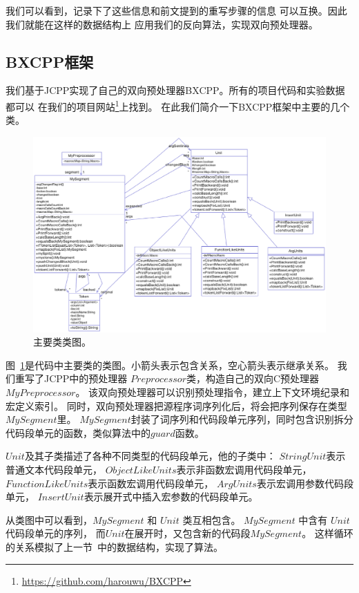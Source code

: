 我们可以看到，记录下了这些信息和前文提到的重写步骤的信息
可以互换。因此我们就能在这样的数据结构上
应用我们的反向算法，实现双向预处理器。


\subsection{BXCPP框架}
我们基于JCPP实现了自己的双向预处理器BXCPP。所有的项目代码和实验数据都可以
在我们的项目网站\footnote{\url{https://github.com/harouwu/BXCPP}}上找到。
在此我们简介一下BXCPP框架中主要的几个类。
\begin{figure}
\centering
\includegraphics[width=14cm]{pics/class.eps}
\caption{主要类类图。\label{pic:classd}}
\end{figure}


图~\ref{pic:classd}是代码中主要类的类图。小箭头表示包含关系，空心箭头表示继承关系。
我们重写了JCPP中的预处理器 $Preprocessor$类，构造自己的双向C预处理器 $MyPreprocessor$。
该双向预处理器可以识别预处理指令，建立上下文环境纪录和宏定义索引。
同时，双向预处理器把源程序词序列化后，将会把序列保存在类型 $MySegment$里。
$MySegment$封装了词序列和代码段单元序列，同时包含识别拆分代码段单元的函数，类似算法中的$guard$函数。


$Unit$及其子类描述了各种不同类型的代码段单元，他的子类中：
$StringUnit$表示普通文本代码段单元，
$ObjectLikeUnits$表示非函数宏调用代码段单元，
$FunctionLikeUnits$表示函数宏调用代码段单元，
$ArgUnits$表示宏调用参数代码段单元，
$InsertUnit$表示展开式中插入宏参数的代码段单元。

从类图中可以看到，$MySegment$ 和 $Unit$ 类互相包含。
$MySegment$ 中含有 $Unit$ 代码段单元的序列，
而$Unit$在展开时，又包含新的代码段$MySegment$。
这样循环的关系模拟了上一节~中的数据结构，实现了算法。

